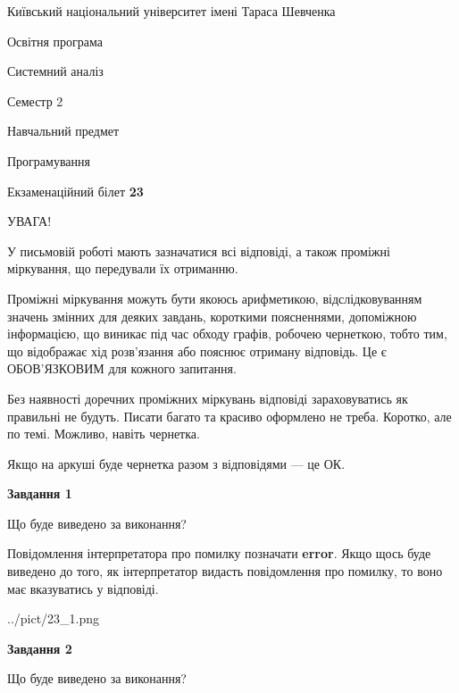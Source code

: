 \documentclass[12pt, ukrainian]{article}
\begin{document}
{{\begin {small}\par
{ \center  Київський національний університет імені Тараса Шевченка \par}
{\parbox {5 cm}{Освітня програма \hfill}{\parbox {7 cm}{Системний аналіз \hfill}}\parbox {6 cm}{\hfill Семестр 2}}\par
{\parbox {5 cm} {Навчальний предмет \hfill}\parbox {7 cm}{Програмування \hfill}\parbox {6cm}{\hfill}\par}\vspace{-7pt} \end{small}}{\center Екзаменаційний білет \No \textbf
{ 23 }\par}}
{
\begin {large}
УВАГА!

У письмовій роботі мають зазначатися всі відповіді, а також проміжні міркування, що передували їх отриманню.

Проміжні міркування можуть бути якоюсь арифметикою, відслідковуванням зна\-чень змінних для деяких завдань,
короткими поясненнями, допоміжною інформацією, що виникає під час обходу графів, робочею чернеткою,
тобто тим, що відображає хід розв’язання або пояснює отриману відповідь.
Це є ОБОВ’ЯЗКОВИМ для кожного запитання.

Без наявності доречних проміжних міркувань відповіді зараховуватись як правиль\-ні не будуть.
Писати багато та красиво оформлено не треба. Коротко, але по темі. Можли\-во, навіть чернетка.

Якщо на аркуші буде чернетка разом з відповідями --- це ОК.

\newpage

{\begin {center}\textbf{Завдання 1}\end {center}}\par
Що буде виведено за виконання?

Повідомлення інтерпретатора про помилку позначати \textbf{error}.
Якщо щось буде виведено до того, як інтерпретатор видасть повідомлення про помилку, 
то воно має вказуватись у відповіді. \par


\begin{center}
	{../pict/23_1.png}
\end{center}
\newpage

{\begin {center}\textbf{Завдання 2}\end {center}}\par
Що буде виведено за виконання?


\end{large}}
\end{document}
